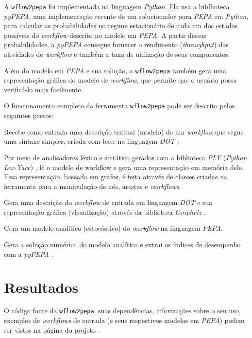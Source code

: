 \documentclass[a4paper,10pt]{article}
\begin{document}
        A \texttt{wflow2pepa} foi implementada na linguagem \emph{Python}. Ela usa a bibllioteca \emph{pyPEPA}\cite{web:pypepa}, uma implementação recente de um solucionador para \emph{PEPA} em \emph{Python}, para calcular as probabilidades no regime estacion\'ario de cada um dos estados poss\'iveis do \emph{workflow} descrito no modelo em \emph{PEPA}. A partir dessas probabilidades, a \emph{pyPEPA} consegue fornecer o rendimento (\emph{throughput}) das atividades do \emph{workflow} e também a taxa de utilizaç\~ao de seus componentes.

        Além do modelo em \emph{PEPA} e sua solução, a \texttt{wflow2pepa} também gera uma representação gráfica do modelo de \emph{workflow}, que permite que o usuário possa verificá-lo mais facilmente.

        O funcionamento completo da ferramenta \texttt{wflow2pepa} pode ser descrito pelos seguintes passos:
        \begin{enumerate*}
            \item Recebe como entrada uma descrição textual (modelo) de um \emph{workflow} que segue uma sintaxe simples, criada com base na linguagem \emph{DOT} \cite{web:dot};
            \item Por meio de analisadores léxico e sintático gerados com a biblioteca \emph{PLY} (\emph{Python Lex-Yacc}) \cite{web:ply}, lê o modelo de workflow e gera uma representação em memória dele. Essa representação, baseada em grafos, é feita através de classes criadas na ferramenta para a manipulação de nós, arestas e \emph{workflows}.
            \item Gera uma descrição do \emph{workflow} de entrada em linguagem \emph{DOT} e sua representação gráfica (visualização) através da biblioteca \emph{Graphviz} \cite{web:graphviz}.
            \item Gera um modelo analítico (estocástico) do \emph{workflow} na linguagem \emph{PEPA}.
            \item Gera a solução numérica do modelo analítico e extrai os índices de desempenho com a  \emph{pyPEPA} .
        \end{enumerate*}


    \section*{Resultados}

	O código fonte da \texttt{wflow2pepa}, suas dependências, informações sobre o seu uso, exemplos de \emph{workflows} de entrada (e seus respectivos modelos em \emph{PEPA}) podem ser vistos na página do projeto \cite{web:script}.
\end{document}
